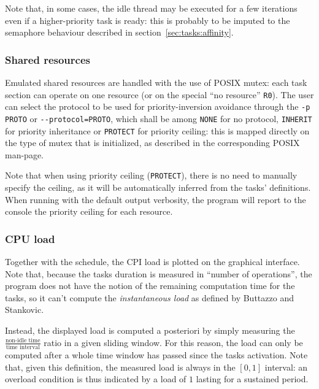 \documentclass[paper=a4, fontsize=11pt]{scrartcl}
\newcommand{\mono}[1]{\texttt{#1}}
\numberwithin{equation}{section}        %
\numberwithin{figure}{section}          %
\numberwithin{table}{section}               %
\numberwithin{fragment}{section}
\begin{document}
Note that, in some cases, the idle thread may be executed for a few iterations even if a higher-priority task is ready: this is probably to be imputed to the semaphore behaviour described in section~\ref{sec:tasks:affinity}.

\subsubsection{Shared resources}\label{sec:tasks:resources}
Emulated shared resources are handled with the use of POSIX mutex: each task section can operate on one resource (or on the special ``no resource'' \mono{R0}).
The user can select the protocol to be used for priority-inversion avoidance through the \mono{-p PROTO} or \mono{-{}-protocol=PROTO}, which shall be among \mono{NONE} for no protocol, \mono{INHERIT} for priority inheritance or \mono{PROTECT} for priority ceiling: this is mapped directly on the type of mutex that is initialized, as described in the corresponding POSIX man-page\cite{man-mutexproto}.

Note that when using priority ceiling (\mono{PROTECT}), there is no need to manually specify the ceiling, as it will be automatically inferred from the tasks' definitions. When running with the default output verbosity, the program will report to the console the priority ceiling for each resource.

\subsubsection{CPU load}\label{sec:tasks:cpuload}
Together with the schedule, the CPI load is plotted on the graphical interface. Note that, because the tasks duration is measured in ``number of operations'', the program does not have the notion of the remaining computation time for the tasks, so it can't compute the \textit{instantaneous load} as defined by Buttazzo and Stankovic\cite{BS-instantaneous-load}.

Instead, the displayed load is computed a posteriori by simply measuring the
$\frac{\text{non-idle time}}{\text{time interval}}$
ratio in a given sliding window. For this reason, the load can only be computed after a whole time window has passed since the tasks activation.
Note that, given this definition, the measured load is always in the $[0,1]$ interval: an overload condition is thus indicated by a load of $1$ lasting for a sustained period.
\end{document}
